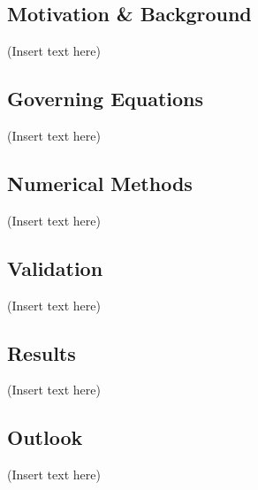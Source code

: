 \subsection{Motivation \& Background}
(Insert text here)

\subsection{Governing Equations}
(Insert text here)

\subsection{Numerical Methods}
(Insert text here)

\subsection{Validation}
(Insert text here)

\subsection{Results}
(Insert text here)

\subsection{Outlook}
(Insert text here)

